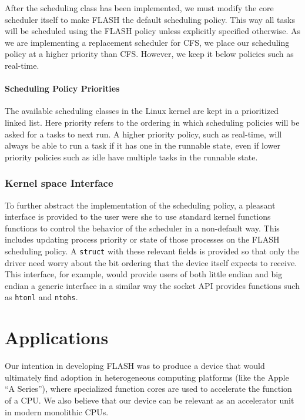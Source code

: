 \documentclass{sig-alternate-10pt}
\begin{document}
After the scheduling class has been implemented, we must modify the core
scheduler itself to make FLASH the default scheduling policy.  This way all
tasks will be scheduled using the FLASH policy unless explicitly specified
otherwise.  As we are implementing a replacement scheduler for CFS, we place
our scheduling policy at a higher priority than CFS.  However, we keep it
below policies such as real-time.

\paragraph{Scheduling Policy Priorities}
The available scheduling classes in the Linux kernel are kept in
a prioritized linked list.  Here priority refers to the ordering in which
scheduling policies will be asked for a tasks to next run.  A higher
priority policy, such as real-time, will always be able to run a task if it
has one in the runnable state, even if lower priority policies such as idle
have multiple tasks in the runnable state.

\subsubsection{Kernel space Interface}
To further abstract the implementation of the scheduling policy, a pleasant
interface is provided to the user were she to use standard kernel functions
functions to control the behavior of the scheduler in a non-default way.
This includes updating process priority or state of those processes on the
FLASH scheduling policy.  A \texttt{struct} with these relevant fields is
provided so that only the driver need worry about the bit ordering that the
device itself expects to receive.  This interface, for example, would
provide users of both little endian and big endian a generic interface in
a similar way the socket API provides functions such as \texttt{htonl} and
\texttt{ntohs}.


\section{Applications}
\label{sec:apps}
Our intention in developing FLASH was to produce a device that would ultimately find adoption in heterogeneous computing platforms (like the Apple ``A Series''), where specialized function cores are used to accelerate the function of a CPU. We also believe that our device can be relevant as an accelerator unit in modern monolithic CPUs.
\end{document}
